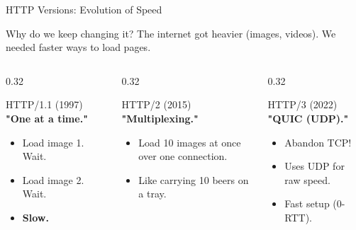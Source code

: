 \documentclass[aspectratio=169]{beamer}  %
\begin{document}
\begin{frame}{HTTP Versions: Evolution of Speed}
    \begin{block}{Why do we keep changing it?}
        \small
        The internet got heavier (images, videos). We needed faster ways to load pages.
    \end{block}
    
    \begin{columns}[T]
        \begin{column}{0.32\textwidth}
            \begin{block}{HTTP/1.1 (1997)}
                \footnotesize
                \textbf{"One at a time."}
                \begin{itemize}
                    \item Load image 1. Wait.
                    \item Load image 2. Wait.
                    \item \textbf{Slow.}
                \end{itemize}
            \end{block}
        \end{column}
        \begin{column}{0.32\textwidth}
            \begin{block}{HTTP/2 (2015)}
                \footnotesize
                \textbf{"Multiplexing."}
                \begin{itemize}
                    \item Load 10 images at once over one connection.
                    \item Like carrying 10 beers on a tray.
                \end{itemize}
            \end{block}
        \end{column}
        \begin{column}{0.32\textwidth}
            \begin{block}{HTTP/3 (2022)}
                \footnotesize
                \textbf{"QUIC (UDP)."}
                \begin{itemize}
                    \item Abandon TCP!
                    \item Uses UDP for raw speed.
                    \item Fast setup (0-RTT).
                \end{itemize}
            \end{block}
        \end{column}
    \end{columns}
\end{frame}
\end{document}
